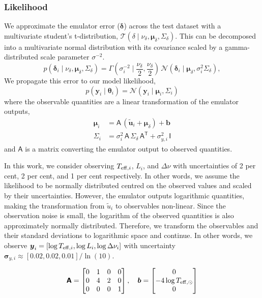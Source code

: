 \documentclass[fleqn,usenatbib]{mnras}
\newcommand{\normaldist}{\mathcal{N}}
\newcommand{\gammadist}{\Gamma}
\newcommand{\tdist}{\mathcal{T}}
\renewcommand*{\vec}[1]{\boldsymbol{#1}}
\newcommand*{\mat}[1]{\boldsymbol{\mathsf{#1}}}
\newcommand*{\transpose}{\mathsf{T}}
\newcommand{\obs}{{y}}
\newcommand{\outputs}{{u}}
\newcommand{\pred}{{\tilde{\outputs}}}
\newcommand{\error}{{\delta}}
\newcommand{\teff}[1][]{{\ensuremath{T_{\mathrm{eff} \ifx#1\empty \else , #1 \fi}}}}
\begin{document}
\subsubsection{Likelihood}

We approximate the emulator error (\(\vec\delta\)) across the test dataset with a multivariate student's t-distribution, \(\tdist(\delta \mid \nu_\delta, \vec\mu_\delta, \mat\Sigma_\delta)\). This can be decomposed into a multivariate normal distribution with its covariance scaled by a gamma-distributed scale parameter \(\sigma^{-2}\).
%
\begin{equation}
    p(\vec\error_i \mid \nu_\delta, \vec\mu_\delta, \mat\Sigma_\delta) = \gammadist(\sigma_i^{-2} \mid \frac{\nu_\delta}{2}, \frac{\nu_\delta}{2}) \, \normaldist(\vec\error_i \mid \vec\mu_\delta, \sigma_i^2 \mat\Sigma_\delta),
\end{equation}
%
We propagate this error to our model likelihood,
%
\begin{equation}
    p(\vec\obs_i \mid \vec\theta_i) = \normaldist(\vec\obs_i \mid \vec\mu_i, \mat\Sigma_i)
\end{equation}
%
where the observable quantities are a linear transformation of the emulator outputs,
%
\begin{align}
    \vec\mu_i &= \mat A \, (\vec\pred_i + \vec\mu_\delta) + \vec b\\
    \mat\Sigma_i &= \sigma_i^2 \, \mat{A} \, \mat{\Sigma}_\delta \, \mat{A}^{\transpose} + \sigma_{y,i}^2 \, \mat{I} \label{eq:covariance}
\end{align}
%
and \(\mat A\) is a matrix converting the emulator output to observed quantities.

In this work, we consider observing \(\teff[i]\), \(L_i\), and \(\Delta\nu\) with uncertainties of 2 per cent, 2 per cent, and 1 per cent respectively. In other words, we assume the likelihood to be normally distributed centred on the observed values and scaled by their uncertainties. However, the emulator outputs logarithmic quantities, making the transformation from \(\pred_i\) to observables non-linear. Since the observation noise is small, the logarithm of the observed quantities is also approximately normally distributed. Therefore, we transform the observables and their standard deviations to logarithmic space and continue. In other words, we observe \(\vec\obs_i = [\log\teff[i], \log L_i, \log\Delta\nu_i]\) with uncertainty \(\vec\sigma_{y, i} \approx [0.02, 0.02, 0.01] / \ln(10)\).

\begin{equation}
    \mat A = 
    \begin{bmatrix}
        0 & 1 & 0 & 0\\
        0 & 4 & 2 & 0\\
        0 & 0 & 0 & 1
    \end{bmatrix}
    , \quad
    \vec b =
    \begin{bmatrix}
        0\\
        - 4 \log \teff[\odot]\\
        0
    \end{bmatrix}
\end{equation}
\end{document}
